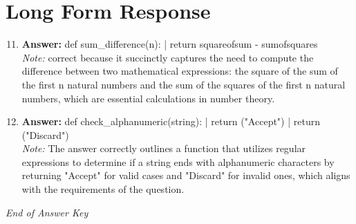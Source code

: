 \documentclass[12pt]{article}
\begin{document}
\section*{Long Form Response}
\begin{enumerate}[label=\arabic*.]
\setcounter{enumi}{10}
\item \textbf{Answer:} def sum\_difference(n): | return squareofsum - sumofsquares
\\ \textit{Note:} correct because it succinctly captures the need to compute the difference between two mathematical expressions: the square of the sum of the first n natural numbers and the sum of the squares of the first n natural numbers, which are essential calculations in number theory.
\item \textbf{Answer:} def check\_alphanumeric(string): | return ("Accept") | return ("Discard")
\\ \textit{Note:} The answer correctly outlines a function that utilizes regular expressions to determine if a string ends with alphanumeric characters by returning "Accept" for valid cases and "Discard" for invalid ones, which aligns with the requirements of the question.
\end{enumerate}

\vfill
\noindent\textit{End of Answer Key}
\end{document}
